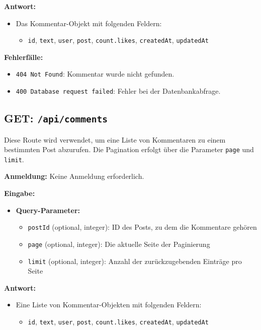 \documentclass[a4paper,12pt]{article}
\begin{document}
\textbf{Antwort:}
\begin{itemize}
    \item Das Kommentar-Objekt mit folgenden Feldern:
    \begin{itemize}
        \item \texttt{id},
              \texttt{text},
              \texttt{user},
              \texttt{post},
              \texttt{count.likes},
              \texttt{createdAt},
              \texttt{updatedAt}
    \end{itemize}
\end{itemize}

\textbf{Fehlerfälle:}
\begin{itemize}
    \item \texttt{404 Not Found}:
        Kommentar wurde nicht gefunden.
    \item \texttt{400 Database request failed}:
        Fehler bei der Datenbankabfrage.
\end{itemize}

\subsection{GET: \texttt{/api/comments}}

Diese Route wird verwendet, um eine Liste von Kommentaren zu einem bestimmten
Post abzurufen. Die Pagination erfolgt über die Parameter \texttt{page} und
\texttt{limit}.

\textbf{Anmeldung:} Keine Anmeldung erforderlich.

\textbf{Eingabe:}
\begin{itemize}
    \item \textbf{Query-Parameter:}
    \begin{itemize}
        \item \texttt{postId} (optional, integer):
            ID des Posts, zu dem die Kommentare gehören
        \item \texttt{page} (optional, integer):
            Die aktuelle Seite der Paginierung
        \item \texttt{limit} (optional, integer):
            Anzahl der zurückzugebenden Einträge pro Seite
    \end{itemize}
\end{itemize}

\textbf{Antwort:}
\begin{itemize}
    \item Eine Liste von Kommentar-Objekten mit folgenden Feldern:
    \begin{itemize}
        \item \texttt{id},
              \texttt{text},
              \texttt{user},
              \texttt{post},
              \texttt{count.likes},
              \texttt{createdAt},
              \texttt{updatedAt}
    \end{itemize}
\end{itemize}
\end{document}
